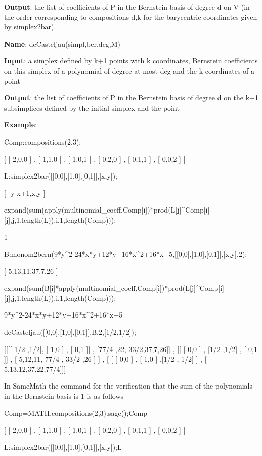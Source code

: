 \documentclass{article}
\begin{document}
 {\bf Output}: the list of coefficients of P in the Bernstein basis of degree d
  on V (in the order corresponding to compositions d,k for the barycentric
  coordinates given by simplex2bar)
  
  
  
  {\bf Name}: deCasteljau(simpl,ber,deg,M)
  
  {\bf Input}: a simplex defined by k+1 points with k coordinates, Bernstein
  coefficients on this simplex of a polynomial of degree at most deg and the k
  coordinates of a point
  
  {\bf Output}: the list of coefficients of P in the Bernstein basis of degree d
  on the k+1 subsimplices defined by the initial simplex and the point

  
  {\bf Example}:
  
  Comp:compositions(2,3);
  
  [ [ 2,0,0 ] , [ 1,1,0 ] , [ 1,0,1 ] , [ 0,2,0 ] , [ 0,1,1 ] , [ 0,0,2 ] ]
  
  L:simplex2bar([[0,0],[1,0],[0,1]],[x,y]);
  
  [ -y-x+1,x,y ]
    
  expand(sum(apply(multinomial\_coeff,Comp[i])*prod(L[j]\^{}Comp[i][j],j,1,length(L)),i,1,length(Comp)));
  
  1
  
  B:monom2bern(9*y\^{}2-24*x*y+12*y+16*x\^{}2+16*x+5,[[0,0],[1,0],[0,1]],[x,y],2);
  
  [ 5,13,11,37,7,26 ]
 
 expand(sum(B[i]*apply(multinomial\_coeff,Comp[i])*prod(L[j]\^{}Comp[i][j],j,1,length(L)),i,1,length(Comp)));
 
9*y\^{}2-24*x*y+12*y+16*x\^{}2+16*x+5
 
   deCasteljau([[0,0],[1,0],[0,1]],B,2,[1/2,1/2]);
   
   [[[[ 1/2 ,1/2], [ 1,0 ] , [ 0,1 ]] , [77/4 ,22, 33/2,37,7,26]] , [[ [ 0,0 ] , [1/2 ,1/2] , [ 0,1 ]] , [ 5,12,11, 77/4 , 33/2 ,26 ] ] , [ [ [ 0,0 ] , [ 1,0 ] ,[1/2 , 1/2] ] , [ 5,13,12,37,22,77/4]]]
    
 \noindent In SameMath the command for the verification that the sum of the polynomials in the Bernstein basis is 1 is as follows 
 
   Comp=MATH.compositions(2,3).sage();Comp
  
  [ [ 2,0,0 ] , [ 1,1,0 ] , [ 1,0,1 ] , [ 0,2,0 ] , [ 0,1,1 ] , [ 0,0,2 ] ]
  
  L:simplex2bar([[0,0],[1,0],[0,1]],[x,y]);L
  
\end{document}
